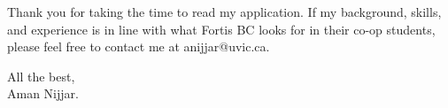 \documentclass[10pt,a4paper,ragged2e,withhyper]{altacv}
\newcommand{\company}{Fortis BC}
\begin{document}
Thank you for taking the time to read my application. If my background, skills, and experience is in line with what {\company} looks for in their co-op students, please feel free to contact me at anijjar@uvic.ca. \linebreak \linebreak 

All the best, \linebreak \linebreak \\

Aman Nijjar.
\end{document}
